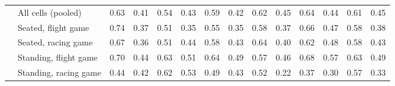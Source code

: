 \begin{table}[ht]
\begin{tabular}{@{}llcccccccccccc@{}}
 & All cells (pooled) & 0.63 & 0.41 & 0.54 & 0.43 & 0.59 & 0.42 & 0.62 & 0.45 & 0.64 & 0.44 & 0.61 & 0.45 \\
 & Seated, flight game & 0.74 & 0.37 & 0.51 & 0.35 & 0.55 & 0.35 & 0.58 & 0.37 & 0.66 & 0.47 & 0.58 & 0.38 \\
 & Seated, racing game & 0.67 & 0.36 & 0.51 & 0.44 & 0.58 & 0.43 & 0.64 & 0.40 & 0.62 & 0.48 & 0.58 & 0.43 \\
 & Standing, flight game & 0.70 & 0.44 & 0.63 & 0.51 & 0.64 & 0.49 & 0.57 & 0.46 & 0.68 & 0.57 & 0.63 & 0.49 \\
 & Standing, racing game & 0.44 & 0.42 & 0.62 & 0.53 & 0.49 & 0.43 & 0.52 & 0.22 & 0.37 & 0.30 & 0.57 & 0.33 \\
\bottomrule
\end{tabular}
\end{table}